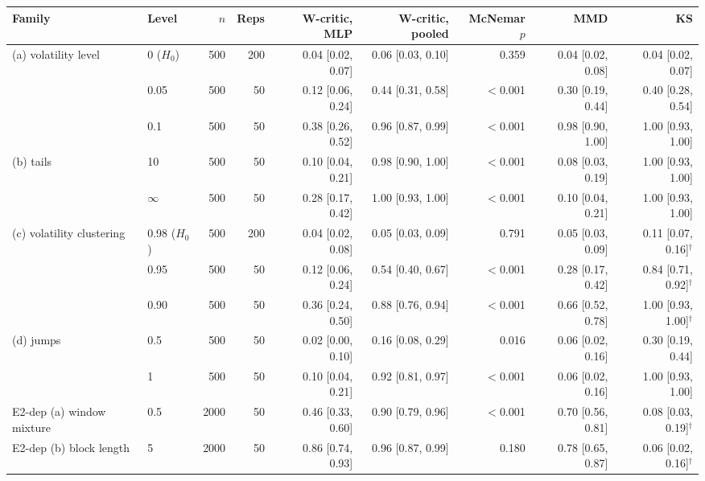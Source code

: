 \begin{tabular}{llrrrrrrr}
\toprule
Family & Level & $n$ & Reps & W-critic, MLP & W-critic, pooled & McNemar $p$ & MMD & KS \\
\midrule
(a) volatility level & 0 ($H_0$) & 500 & 200 & 0.04 [0.02, 0.07] & 0.06 [0.03, 0.10] & 0.359 & 0.04 [0.02, 0.08] & 0.04 [0.02, 0.07] \\
 & 0.05 & 500 & 50 & 0.12 [0.06, 0.24] & 0.44 [0.31, 0.58] & $<$0.001 & 0.30 [0.19, 0.44] & 0.40 [0.28, 0.54] \\
 & 0.1 & 500 & 50 & 0.38 [0.26, 0.52] & 0.96 [0.87, 0.99] & $<$0.001 & 0.98 [0.90, 1.00] & 1.00 [0.93, 1.00] \\
(b) tails & 10 & 500 & 50 & 0.10 [0.04, 0.21] & 0.98 [0.90, 1.00] & $<$0.001 & 0.08 [0.03, 0.19] & 1.00 [0.93, 1.00] \\
 & $\infty$ & 500 & 50 & 0.28 [0.17, 0.42] & 1.00 [0.93, 1.00] & $<$0.001 & 0.10 [0.04, 0.21] & 1.00 [0.93, 1.00] \\
(c) volatility clustering & 0.98 ($H_0$) & 500 & 200 & 0.04 [0.02, 0.08] & 0.05 [0.03, 0.09] & 0.791 & 0.05 [0.03, 0.09] & 0.11 [0.07, 0.16]$^{\dagger}$ \\
 & 0.95 & 500 & 50 & 0.12 [0.06, 0.24] & 0.54 [0.40, 0.67] & $<$0.001 & 0.28 [0.17, 0.42] & 0.84 [0.71, 0.92]$^{\dagger}$ \\
 & 0.90 & 500 & 50 & 0.36 [0.24, 0.50] & 0.88 [0.76, 0.94] & $<$0.001 & 0.66 [0.52, 0.78] & 1.00 [0.93, 1.00]$^{\dagger}$ \\
(d) jumps & 0.5 & 500 & 50 & 0.02 [0.00, 0.10] & 0.16 [0.08, 0.29] & 0.016 & 0.06 [0.02, 0.16] & 0.30 [0.19, 0.44] \\
 & 1 & 500 & 50 & 0.10 [0.04, 0.21] & 0.92 [0.81, 0.97] & $<$0.001 & 0.06 [0.02, 0.16] & 1.00 [0.93, 1.00] \\
E2-dep (a) window mixture & 0.5 & 2000 & 50 & 0.46 [0.33, 0.60] & 0.90 [0.79, 0.96] & $<$0.001 & 0.70 [0.56, 0.81] & 0.08 [0.03, 0.19]$^{\dagger}$ \\
E2-dep (b) block length & 5 & 2000 & 50 & 0.86 [0.74, 0.93] & 0.96 [0.87, 0.99] & 0.180 & 0.78 [0.65, 0.87] & 0.06 [0.02, 0.16]$^{\dagger}$ \\
\bottomrule
\end{tabular}
